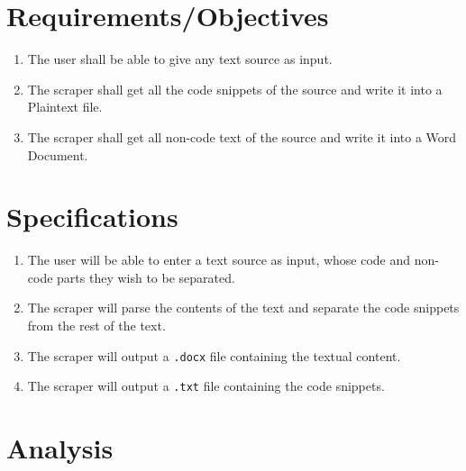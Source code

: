 \documentclass[12pt]{scrreprt}
\newcommand{\ttt}[1]{\texttt{#1}}
\begin{document}



\section{Requirements/Objectives}

\begin{enumerate}
    \item The user shall be able to give any text source as input.
    \item The scraper shall get all the code snippets of the source and write it into a Plaintext file.
    \item The scraper shall get all non-code text of the source and write it into a Word Document.
\end{enumerate}


\section{Specifications}

\begin{enumerate}
    \item The user will be able to enter a text source as input, whose code and non-code parts they wish to be separated.
    \item The scraper will parse the contents of the text and separate the code snippets from the rest of the text.
    \item The scraper will output a \texttt{.docx} file containing the textual content.
    \item The scraper will output a \ttt{.txt} file containing the code snippets.  
\end{enumerate}



\section{Analysis}
\end{document}
